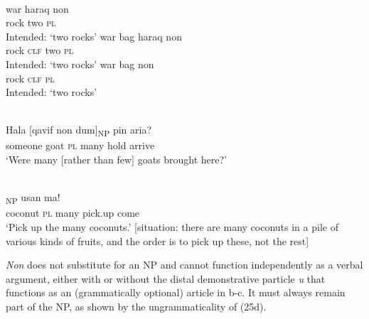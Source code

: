 \ea%
\label{ex:9:22}
 \\
\ea
\gll  *war haraq non \\
  rock two \textsc{pl}   \\
\glt Intended: `two rocks'
\ex
\gll *war bag haraq non \\
  rock \textsc{clf} two \textsc{pl}   \\
\glt  Intended: `two rocks'
\ex
\gll *war bag non \\
   rock \textsc{clf} \textsc{pl}  \\
\glt Intended: `two rocks'
\z
\z





\ea%
\label{ex:9:23}
 \\
\gll Hala [{qavif} non {dum}]\textsubscript{NP} pin aria{{\textglotstop}}{?} \\
  someone goat \textsc{pl} many hold arrive   \\
\glt `Were many [rather than few] goats brought here?'
\z







\ea%
\label{ex:9:24}
 \\
\textsubscript{NP} usan ma! \\
  coconut \textsc{pl} many pick.up come  \\
\glt `Pick up the many coconuts.' [situation: there are many coconuts in a pile of various kinds of fruits, and the order is to pick up these, not the rest]
\z






\textit{Non} does not substitute for an NP and cannot function independently as a verbal argument, either with or without the distal demonstrative particle \textit{u} that functions as an (grammatically optional) article in b-c. It must always remain part of the NP, as shown by the ungrammaticality of (25d).


